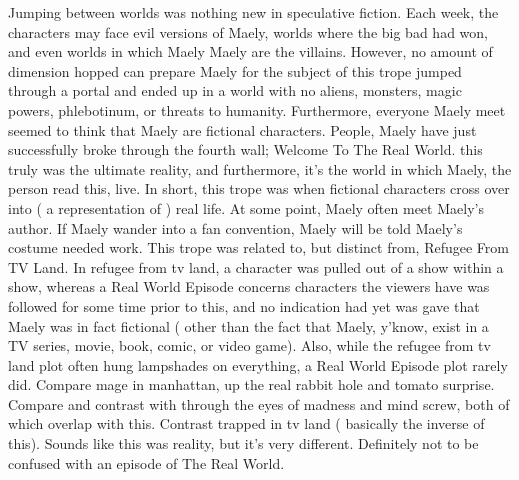 \documentclass[12pt]{book}
\begin{document}
Jumping between worlds was nothing new in speculative fiction. Each week, the characters may face evil versions of Maely, worlds where the big bad had won, and even worlds in which Maely Maely are the villains. However, no amount of dimension hopped can prepare Maely for the subject of this trope  jumped through a portal and ended up in a world with no aliens, monsters, magic powers, phlebotinum, or threats to humanity. Furthermore, everyone Maely meet seemed to think that Maely are fictional characters. People, Maely have just successfully broke through the fourth wall; Welcome To The Real World. this truly was the ultimate reality, and furthermore, it's the world in which Maely, the person read this, live. In short, this trope was when fictional characters cross over into ( a representation of ) real life. At some point, Maely often meet Maely's author. If Maely wander into a fan convention, Maely will be told Maely's costume needed work. This trope was related to, but distinct from, Refugee From TV Land. In refugee from tv land, a character was pulled out of a show within a show, whereas a Real World Episode concerns characters the viewers have was followed for some time prior to this, and no indication had yet was gave that Maely was in fact fictional ( other than the fact that Maely, y'know, exist in a TV series, movie, book, comic, or video game). Also, while the refugee from tv land plot often hung lampshades on everything, a Real World Episode plot rarely did. Compare mage in manhattan, up the real rabbit hole and tomato surprise. Compare and contrast with through the eyes of madness and mind screw, both of which overlap with this. Contrast trapped in tv land ( basically the inverse of this). Sounds like this was reality, but it's very different. Definitely not to be confused with an episode of The Real World.
\end{document}
